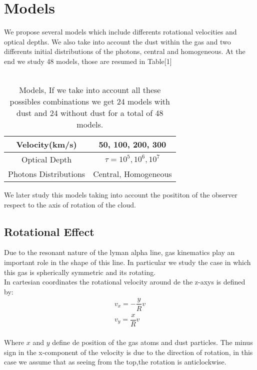 \documentclass{article}
\theoremstyle{definition}
\theoremstyle{remark}
\begin{document}
\section*{Models}

We propose several models which include differents rotational velocities and optical depths. We also take into account the dust within the gas and two differents initial distributions of the photons, central and homogeneous. At the end we study 48 models, those are resumed in Table[1]\\
\\
\begin{table}[H]
\begin{center}
\begin{tabular}{|c|c|}
\hline
Velocity(km/s) & 50, 100, 200, 300\\
\hline
Optical Depth & $\tau = 10^{5},10^{6},10^{7}$\\
\hline
Photons Distributions & Central, Homogeneous\\
\hline
\end{tabular}
\caption{Models, If we take into account all these possibles combinations we get 24 models with dust and 24 without dust for a total of 48 models.}
\end{center}
\end{table}

We later study this models taking into account the posititon of the observer respect to the axis of rotation of the cloud.

\subsection*{Rotational Effect}

Due to the resonant nature of the lyman alpha line, gas kinematics play an important role in the shape of this line. In particular we study the case in which this gas is spherically symmetric and its rotating.\\

In cartesian coordinates the rotational velocity around de the z-axys is defined by:\\

\begin{subequations}
\begin{align}
    v_{x}=-\dfrac{y}{R}v \label{subeq1}\\
    v_{y}=\dfrac{x}{R}v \label{subeq2}
\end{align}
\end{subequations}
\\
Where $x$ and $y$ define de position of the gas atoms and dust particles. The minus sign in the x-component of the velocity is due to the direction of rotation, in this case we assume that as seeing from the top,the rotation is anticlockwise.\\   
\end{document}
